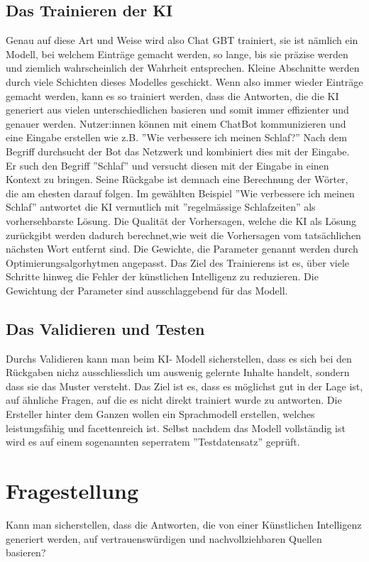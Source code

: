 \documentclass{article}
\begin{document}
\subsection{Das Trainieren der KI} 
Genau auf diese Art und Weise wird also Chat GBT trainiert, sie ist nämlich ein Modell, bei welchem Einträge gemacht werden, so lange, bis sie präzise werden und ziemlich wahrscheinlich der Wahrheit entsprechen. Kleine Abschnitte werden durch viele Schichten dieses Modelles geschickt. Wenn also immer wieder Einträge gemacht werden, kann es so trainiert werden, dass die Antworten, die die KI generiert aus vielen unterschiedlichen basieren und somit immer effizienter und genauer werden. Nutzer:innen können mit einem ChatBot kommunizieren und eine Eingabe erstellen wie z.B. ''Wie verbessere ich meinen Schlaf?'' Nach dem Begriff durchsucht der Bot das Netzwerk und kombiniert dies mit der Eingabe. Er such den Begriff ''Schlaf'' und versucht diesen mit der Eingabe in einen Kontext zu bringen. Seine Rückgabe ist demnach eine Berechnung der Wörter, die am ehesten darauf folgen. Im gewählten Beispiel ''Wie verbessere ich meinen Schlaf'' antwortet die KI vermutlich mit ''regelmässige Schlafzeiten'' als vorhersehbarste Lösung. Die Qualität der Vorhersagen, welche die KI als Lösung zurückgibt werden dadurch berechnet,wie weit die Vorhersagen vom tatsächlichen nächsten Wort entfernt sind.
Die Gewichte, die Parameter genannt werden durch Optimierungsalgorhytmen angepasst. Das Ziel des Trainierens ist es, über viele Schritte hinweg die Fehler der künstlichen Intelligenz zu reduzieren. Die Gewichtung der Parameter sind ausschlaggebend für das Modell.

\subsection{Das Validieren und Testen}
Durchs Validieren kann man beim KI- Modell sicherstellen, dass es sich bei den Rückgaben nichz ausschliesslich um auswenig gelernte Inhalte handelt, sondern dass sie das Muster versteht. Das Ziel ist es, dass es möglichst gut in der Lage ist, auf ähnliche Fragen, auf die es nicht direkt trainiert wurde zu antworten. Die Ersteller hinter dem Ganzen wollen ein Sprachmodell erstellen, welches leistungsfähig und facettenreich ist. Selbst nachdem das Modell vollständig ist wird es auf einem sogenannten seperratem ''Testdatensatz'' geprüft.

\section{Fragestellung}
Kann man sicherstellen, dass die Antworten, die von einer Künstlichen Intelligenz generiert werden, auf vertrauenswürdigen und nachvollziehbaren Quellen basieren?
\end{document}
